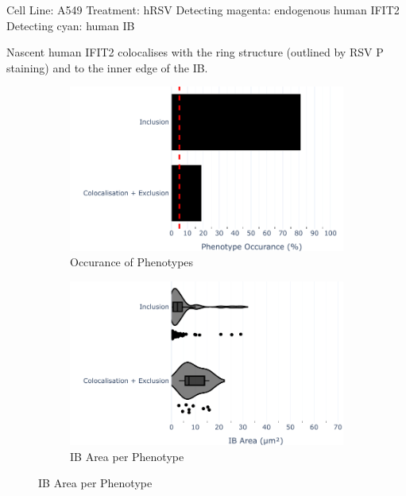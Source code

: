 Cell Line: A549 \newline
Treatment: hRSV \newline
Detecting magenta: endogenous human IFIT2  \newline
Detecting cyan: human IB \newline

Nascent human IFIT2 colocalises with the ring structure (outlined by RSV P staining) and to the inner edge of the IB.

\begin{figure}
    \begin{subfigure}{0.5\textwidth}
    \includegraphics[width=1\linewidth]{10. Chapter 5/Figs/01. Infection/01. IFIT2A/04. bar_i2a_a549-p.pdf} 
    \caption[]{Occurance of Phenotypes}
    \end{subfigure}
    \begin{subfigure}{0.5\textwidth}
    \includegraphics[width=1\linewidth]{10. Chapter 5/Figs/01. Infection/01. IFIT2A/05. violin_i2a_a549-p.pdf}
    \caption[]{IB Area per Phenotype}
    \end{subfigure}


\end{figure}
